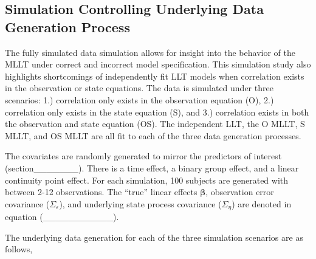 \documentclass[
]{article}
\author{}
\date{\vspace{-2.5em}}
\begin{document}
\hypertarget{simulation-controlling-underlying-data-generation-process}{%
\subsection{Simulation Controlling Underlying Data Generation Process}\label{simulation-controlling-underlying-data-generation-process}}

The fully simulated data simulation allows for insight into the behavior of the MLLT under correct and incorrect model specification. This simulation study also highlights shortcomings of independently fit LLT models when correlation exists in the observation or state equations. The data is simulated under three scenarios: 1.) correlation only exists in the observation equation (O), 2.) correlation only exists in the state equation (S), and 3.) correlation exists in both the observation and state equation (OS). The independent LLT, the O MLLT, S MLLT, and OS MLLT are all fit to each of the three data generation processes.

The covariates are randomly generated to mirror the predictors of interest (section\_\_\_\_\_\_\_). There is a time effect, a binary group effect, and a linear continuity point effect. For each simulation, 100 subjects are generated with between 2-12 observations. The ``true'' linear effects \(\boldsymbol{\beta}\), observation error covariance (\(\Sigma_\varepsilon\)), and underlying state process covariance (\(\Sigma_\eta\)) are denoted in equation (\_\_\_\_\_\_\_\_\_\_\_).

The underlying data generation for each of the three simulation scenarios are as follows,
\end{document}
